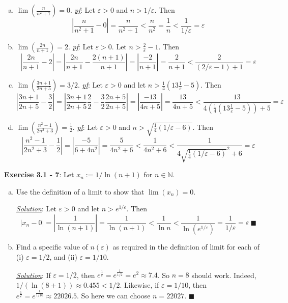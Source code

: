 \documentclass{article}
\begin{document}
\begin{enumerate}[(a)] %
  \item $\lim(\frac{n}{n^2+1})=0$.
    \underline{\textit{pf}}:
    Let $\varepsilon > 0$ and $n > 1/\varepsilon$.
    Then $$\left|\frac{n}{n^2+1} - 0\right|
    = \frac{n}{n^2+1} < \frac{n}{n^2}
    = \frac{1}{n} < \frac{1}{1/\varepsilon}
    = \varepsilon$$
  \item $\lim(\frac{2n}{n+1}) = 2$.
    \underline{\textit{pf}}: Let $\varepsilon > 0$. Let
    $n > \frac{2}{\varepsilon} - 1$.
    Then $$\left|\frac{2n}{n+1} - 2\right|
    = \left|\frac{2n}{n+1} - \frac{2(n+1)}{n+1}\right|
    = \left|\frac{-2}{n+1}\right|
    = \frac{2}{n+1} < \frac{2}{(2/\varepsilon - 1) + 1}
    = \varepsilon$$
  \item $\lim(\frac{3n+1}{2n+5}) = 3/2$.
    \underline{\textit{pf}}: Let $\varepsilon > 0$ and let
    $n > \frac{1}{4}(13\frac{1}{\varepsilon} - 5)$.
    Then $$\left|\frac{3n+1}{2n+5} - \frac{3}{2}\right|
    = \left|\frac{3n+1}{2n+5} \frac{2}{2} - \frac{3}{2} \frac{2n+5}{2n+5}\right|
    = \left|\frac{-13}{4n+5}\right|
    = \frac{13}{4n+5}
    < \frac{13}{4(\frac{1}{4}(13\frac{1}{\varepsilon} - 5))+5}
    = \varepsilon$$
  \item $\lim(\frac{n^2-1}{2n^2+3}) = \frac{1}{2}$.
    \underline{\textit{pf}}:
    Let $\varepsilon > 0$ and
    $n > \sqrt{\frac{1}{4} (1/{\varepsilon} - 6)}$. Then
    $$\left|\frac{n^2-1}{2n^2+3} - \frac{1}{2}\right|
    = \left|\frac{-5}{6+4n^2}\right|
    = \frac{5}{4n^2+6}
    < \frac{1}{4n^2+6}
    < \frac{1}{4\sqrt{\frac{1}{4} (1/{\varepsilon} - 6)}^2+6}
    = \varepsilon$$
\end{enumerate}

\hrulefill

\textbf{Exercise 3.1 - 7}: Let $x_n := 1/ \ln (n+1)$ for
$n \in \mathbb{N}$.
\begin{enumerate}[(a)]
  \item Use the definition of a limit to show that $\lim(x_n)=0$.

    \underline{\textit{Solution}}: Let $\varepsilon > 0$ and let
    $n > e^{1/\varepsilon}$. Then
    $$\left|x_n - 0\right|
    = \left|\frac{1}{\ln(n+1)}\right|
    = \frac{1}{\ln(n+1)}
    < \frac{1}{\ln n}
    < \frac{1}{\ln (e^{1/\varepsilon})}
    = \frac{1}{1/\varepsilon}
    = \varepsilon \ \blacksquare$$

  \item Find a specific value of $n(\varepsilon)$ as required in the
    definition of limit for each of (i) $\varepsilon = 1/2$,
    and (ii) $\varepsilon = 1/10$.

    \underline{\textit{Solution}}: If $\varepsilon = 1/2$, then
    $e^{\frac{1}{\varepsilon}} = e^{\frac{1}{1/2}} = e^2 \approx 7.4$. So
    $n = 8$ should work. Indeed, $1/(\ln(8+1)) \approx 0.455 < 1/2$.
    Likewise, if $\varepsilon = 1/10$, then $e^{\frac{1}{\varepsilon}}
    = e^{\frac{1}{1/10}} \approx 22026.5$. So here we can choose
    $n = 22027$. $\blacksquare$
\end{enumerate}
\end{document}
